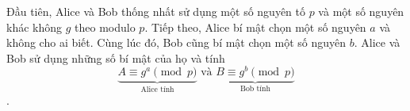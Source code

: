 
Đầu tiên, Alice và Bob thống nhất sử dụng một số nguyên tố $p$ và một số nguyên khác không $g$  theo modulo $p$. 
Tiếp theo, Alice bí mật chọn một số nguyên $a$ và không cho ai biết. Cùng lúc đó, Bob cũng bí mật chọn một số nguyên $b$.
Alice và Bob sử dụng những số bí mật của họ và tính
$$\underbrace{A \equiv g^a \pmod{p}}_{\text{Alice tính}} \text{ và } \underbrace{B \equiv g^b \pmod{p}}_{\text{Bob tính}}$$.


